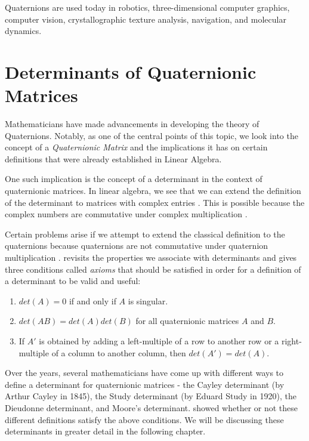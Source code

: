 Quaternions are used today in robotics, three-dimensional computer graphics, computer vision, crystallographic texture analysis, navigation, and molecular dynamics. 

\section{Determinants of Quaternionic Matrices}

Mathematicians have made advancements in developing the theory of Quaternions. Notably, as one of the central points of this topic, we look into the concept of a \emph{Quaternionic Matrix} and the implications it has on certain definitions that were already established in Linear Algebra. 

One such implication is the concept of a determinant in the context of quaternionic matrices. In linear algebra, we see that we can extend the definition of the determinant to matrices with complex entries \cite{stamaria}. This is possible because the complex numbers are commutative under complex multiplication \cite{aslaksen}. 

Certain problems arise if we attempt to extend the classical definition to the quaternions because quaternions are not commutative under quaternion multiplication \cite{aslaksen}. \cite{aslaksen} revisits the properties we associate with determinants and gives three conditions called \emph{axioms} that should be satisfied in order for a definition of a determinant to be valid and useful:
\begin{enumerate}
	\item $det(A) = 0$ if and only if $A$ is singular.
	\item $det(AB) = det(A)det(B)$ for all quaternionic matrices $A$ and $B$.
	\item If $A'$ is obtained by adding a left-multiple of a row to another row or a right-multiple of a column to another column, then $det(A')=det(A)$.
\end{enumerate}

Over the years, several mathematicians have come up with different ways to define a determinant for quaternionic matrices - the Cayley determinant (by Arthur Cayley in 1845), the Study determinant (by Eduard Study in 1920), the Dieudonne determinant, and Moore's determinant. \cite{aslaksen} showed whether or not these different definitions satisfy the above conditions. We will be discussing these determinants in greater detail in the following chapter.

